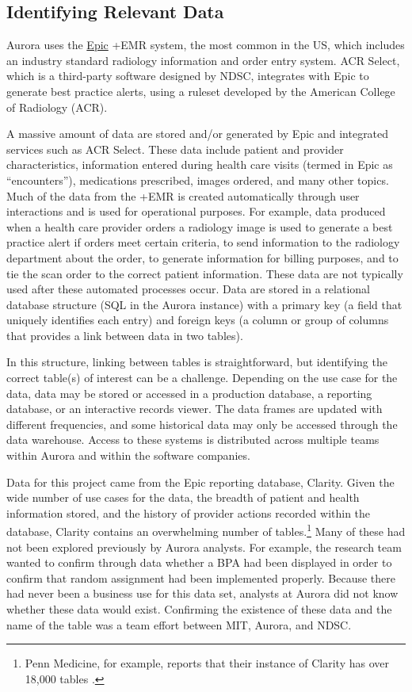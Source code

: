 \documentclass[
]{book}
\begin{document}
\hypertarget{identifying-relevant-data}{%
\subsection{Identifying Relevant Data}\label{identifying-relevant-data}}

Aurora uses the \href{https://www.epic.com/}{Epic} +EMR\textbar{} system, the most common in the US, which includes an industry standard radiology information and order entry system. ACR Select, which is a third-party software designed by NDSC, integrates with Epic to generate best practice alerts, using a ruleset developed by the American College of Radiology (ACR).

A massive amount of data are stored and/or generated by Epic and integrated services such as ACR Select. These data include patient and provider characteristics, information entered during health care visits (termed in Epic as ``encounters''), medications prescribed, images ordered, and many other topics. Much of the data from the +EMR\textbar{} is created automatically through user interactions and is used for operational purposes. For example, data produced when a health care provider orders a radiology image is used to generate a best practice alert if orders meet certain criteria, to send information to the radiology department about the order, to generate information for billing purposes, and to tie the scan order to the correct patient information. These data are not typically used after these automated processes occur. Data are stored in a relational database structure (SQL in the Aurora instance) with a primary key (a field that uniquely identifies each entry) and foreign keys (a column or group of columns that provides a link between data in two tables).

In this structure, linking between tables is straightforward, but identifying the correct table(s) of interest can be a challenge. Depending on the use case for the data, data may be stored or accessed in a production database, a reporting database, or an interactive records viewer. The data frames are updated with different frequencies, and some historical data may only be accessed through the data warehouse. Access to these systems is distributed across multiple teams within Aurora and within the software companies.

Data for this project came from the Epic reporting database, Clarity. Given the wide number of use cases for the data, the breadth of patient and health information stored, and the history of provider actions recorded within the database, Clarity contains an overwhelming number of tables.\footnote{Penn Medicine, for example, reports that their instance of Clarity has over 18,000 tables \citep{pennmedicineinformationsystemsdataanalyticscenter}.} Many of these had not been explored previously by Aurora analysts. For example, the research team wanted to confirm through data whether a BPA had been displayed in order to confirm that random assignment had been implemented properly. Because there had never been a business use for this data set, analysts at Aurora did not know whether these data would exist. Confirming the existence of these data and the name of the table was a team effort between MIT, Aurora, and NDSC.
\end{document}
